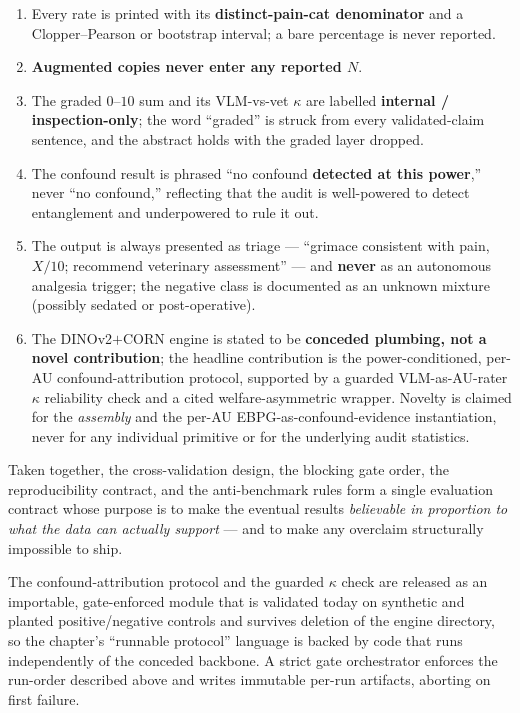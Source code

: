\begin{enumerate}
  \item Every rate is printed with its \textbf{distinct-pain-cat denominator} and a
        Clopper--Pearson or bootstrap interval; a bare percentage is never reported.
  \item \textbf{Augmented copies never enter any reported $N$}.
  \item The graded $0\text{--}10$ sum and its VLM-vs-vet $\kappa$ are labelled
        \textbf{internal / inspection-only}; the word ``graded'' is struck from every
        validated-claim sentence, and the abstract holds with the graded layer dropped.
  \item The confound result is phrased ``no confound \textbf{detected at this power},'' never
        ``no confound,'' reflecting that the audit is well-powered to detect entanglement and
        underpowered to rule it out.
  \item The output is always presented as triage --- ``grimace consistent with pain, $X/10$;
        recommend veterinary assessment'' --- and \textbf{never} as an autonomous analgesia
        trigger; the negative class is documented as an unknown mixture (possibly sedated or
        post-operative).
  \item The DINOv2$+$CORN engine is stated to be \textbf{conceded plumbing, not a novel
        contribution}; the headline contribution is the power-conditioned, per-AU
        confound-attribution protocol, supported by a guarded VLM-as-AU-rater $\kappa$
        reliability check and a cited welfare-asymmetric wrapper. Novelty is claimed for the
        \emph{assembly} and the per-AU EBPG-as-confound-evidence instantiation, never for any
        individual primitive or for the underlying audit statistics.
\end{enumerate}

Taken together, the cross-validation design, the blocking gate order, the reproducibility
contract, and the anti-benchmark rules form a single evaluation contract whose purpose is to
make the eventual results \emph{believable in proportion to what the data can actually
support} --- and to make any overclaim structurally impossible to ship.

The confound-attribution protocol and the guarded $\kappa$ check are released as an importable,
gate-enforced module that is validated today on synthetic and planted positive/negative controls
and survives deletion of the engine directory, so the chapter's ``runnable protocol'' language is
backed by code that runs independently of the conceded backbone. A strict gate orchestrator
enforces the run-order described above and writes immutable per-run artifacts, aborting on first
failure.
